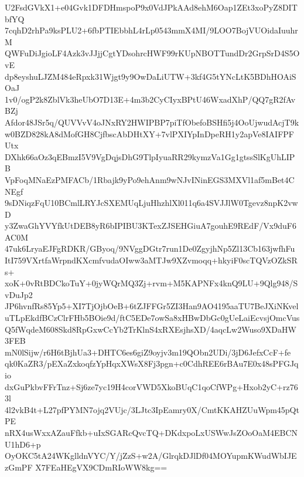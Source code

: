 U2FsdGVkX1+e04Gvk1DFDHmspoP9x0VdJPkAAd8ehM6Oap1ZEt3xoPyZ8DITbfYQ
7cqhD2rhPa9ksPLU2+6fbPTIEbbhL4rLp0543mmX4MI/9LOO7BojVUOidaIuuhrM
QWFuDiJgioLF4Azk3vJJjjCgtYDsohrcHWF99rKUpNBOTTundDr2GrpSrD4S5OvE
dp8eyshuLJZM484eRpxk31Wjgt9y9OwDaLiUTW+3kf4G5tYNcLtK5BDhHOAiSOaJ
1v0/ogP2k8ZblVk3heUbO7D13E+4m3b2CyCIyxBPtU46WxadXhP/QQ7gR2fAvBZj
Afdor48JSr5q/QUVVvV4oJNxRY2HWIPBP7piTfObefoBSHfi5j4OoUjwudAcjT9k
w0BZD828kA8dMofGH8CjfbscAbDHtXY+7vlPXIYpInDpeRH1y2apVe8IAIFPFUtx
DXhk66aOz3qEBmzI5V9VgDqjsDhG9TlpIyuaRR29kymzVa1Gg1gtssSlKgUhLIPB
VpFoqMNaEzPMFACb/1Rbajk9yPo9ehAnm9wNJvINinEGS3MXVl1af5mBet4CNEgf
9sDNiqzFqU10BCmlLRYJcSXEMUqLjuHhzhlXl011q6a4SVJJlW0Tgevz8npK2vwD
y3ZwaGhYVYfkUtDEB8yR6bIPIBU3KTexZJSEHGiuA7gouhE9REdF/Vx9duF6AC0M
47uk6LryaEJFgRDKR/GByoq/9NVggDGtr7run1De0ZgyjhNp5Zl13Cb163jwfhFu
ItI759VXrtfaWrpndKXcmfvudaOIww3aMTJw9XZvmoqq+hkyiF0scTQVzOZkSRs+
xoK+0vRtBDCkoTuY+0jyWQrMQ3Zj+rvm+M5KAPNFx4knQ9LU+9Qlg948/SvDuJp2
JP6hvnfRs85Yp5+XI7TjOjbOeB+6tZJFFGr5ZI3Han9AO4195aaTU7BeJXiNKvel
uTLpEkdfBCzClrFHb5BOie9d/ftC5EDe7owSa8xHBwDbGc0gUeLaiEcvsjOmcVus
Q5fWqdeM608Skd8RpGxwCcYb2TrKlnS4xRXEsjhsXD/4aqcLw2Wuso9XDaHW3FEB
mN0lSijw/r6H6tBjhUa3+DHTC6es6giZ9oyjv3m19QObn2UDi/3jD6JefxCcF+fe
qk0KaZR3/pEXaZxkoqfzYpHqxXWsX8Fj3pgn+c0CdhREE6rBAu7E0x48sPFGJqio
dxGuPkbvFFrTnz+Sj6ze7yc19H4corVWD5XkoBUqC1qoCfWPg+Hxob2yC+rz763l
4l2vkB4t+L27pfPYMN7ojq2VUjc/3LJtc3IpEamry0X/CmtKKAHZUuWpm45pQtPE
nRX4usWxxAZauFfkb+uIxSGARcQvcTQ+DKdxpoLxUSWwJsZOoOaM4EBCNU1hD6+p
OyOKC5tA24WKglldnVYC/Y/jZzS+w2A/GlrqkDJlDf04MOYupmKWudWbIJEzGmPF
X7FEaHEgVX9CDmRIoWW8kg==
